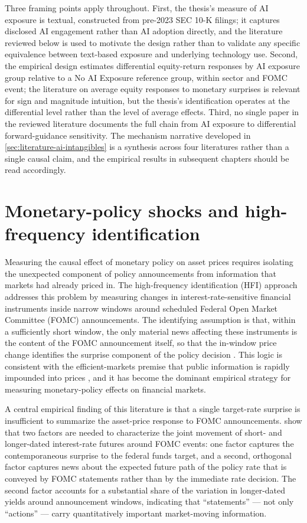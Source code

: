 Three framing points apply throughout. First, the thesis's measure of
AI exposure is textual, constructed from pre-2023 SEC 10-K filings;
it captures disclosed AI engagement rather than AI adoption directly,
and the literature reviewed below is used to motivate the design
rather than to validate any specific equivalence between text-based
exposure and underlying technology use. Second, the empirical design
estimates differential equity-return responses by AI exposure group
relative to a No AI Exposure reference group, within sector and FOMC
event; the literature on average equity responses to monetary
surprises is relevant for sign and magnitude intuition, but the
thesis's identification operates at the differential level rather
than the level of average effects. Third, no single paper in the
reviewed literature documents the full chain from AI exposure to
differential forward-guidance sensitivity. The mechanism narrative
developed in \cref{sec:literature-ai-intangibles} is a synthesis
across four literatures rather than a single causal claim, and the
empirical results in subsequent chapters should be read accordingly.

\section{Monetary-policy shocks and high-frequency identification}
\label{sec:literature-hfi}

Measuring the causal effect of monetary policy on asset prices requires
isolating the unexpected component of policy announcements from
information that markets had already priced in. The high-frequency
identification (HFI) approach addresses this problem by measuring
changes in interest-rate-sensitive financial instruments inside narrow
windows around scheduled Federal Open Market Committee (FOMC)
announcements. The identifying assumption is that, within a sufficiently
short window, the only material news affecting these instruments is the
content of the FOMC announcement itself, so that the in-window price
change identifies the surprise component of the policy decision
\citep{gurkaynakSackSwanson2005}. This logic is consistent with the
efficient-markets premise that public information is rapidly impounded
into prices \citep{fama1970}, and it has become the dominant empirical
strategy for measuring monetary-policy effects on financial markets.

A central empirical finding of this literature is that a single
target-rate surprise is insufficient to summarize the asset-price
response to FOMC announcements. \citet{gurkaynakSackSwanson2005} show
that two factors are needed to characterize the joint movement of
short- and longer-dated interest-rate futures around FOMC events: one
factor captures the contemporaneous surprise to the federal funds
target, and a second, orthogonal factor captures news about the
expected future path of the policy rate that is conveyed by FOMC
statements rather than by the immediate rate decision. The second
factor accounts for a substantial share of the variation in
longer-dated yields around announcement windows, indicating that
``statements'' --- not only ``actions'' --- carry quantitatively
important market-moving information.

